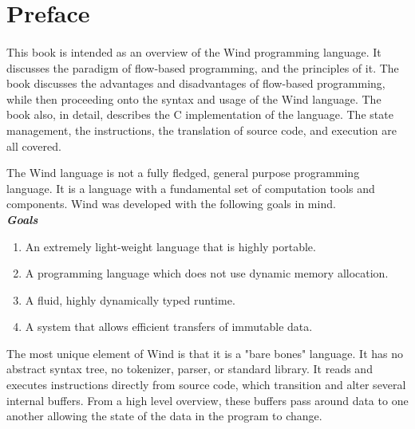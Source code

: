 
\section{Preface}

\paragraph{   } This book is intended as an overview of the Wind programming language. It discusses the paradigm of flow-based programming, and the principles of it. The book discusses the advantages and disadvantages of flow-based programming, while then proceeding onto the syntax and usage of the Wind language. The book also, in detail, describes the C implementation of the language. The state management, the instructions, the translation of source code, and execution are all covered. 

\par The Wind language is not a fully fledged, general purpose programming language. It is a language with a fundamental set of computation tools and components. Wind was developed with the following goals in mind. \\

\textbf{\emph{Goals}}
\begin{enumerate}
\item An extremely light-weight language that is highly portable.
\item A programming language which does not use dynamic memory allocation.
\item A fluid, highly dynamically typed runtime.
\item A system that allows efficient transfers of immutable data.
\end{enumerate}

\par The most unique element of Wind is that it is a "bare bones" language. It has no abstract syntax tree, no tokenizer, parser, or standard library. It reads and executes instructions directly from source code, which transition and alter several internal buffers. From a high level overview, these buffers pass around data to one another allowing the state of the data in the program to change.